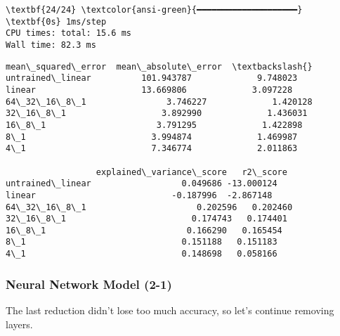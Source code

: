 \documentclass[11pt]{article}
\makeatletter
\newcommand{\boxspacing}{\kern\kvtcb@left@rule\kern\kvtcb@boxsep}
\newcommand{\prompt}[4]{
        {\ttfamily\llap{{\color{#2}[#3]:\hspace{3pt}#4}}\vspace{-\baselineskip}}
    }
\makeatother
\begin{document}
    \begin{Verbatim}[commandchars=\\\{\}]
\textbf{24/24} \textcolor{ansi-green}{━━━━━━━━━━━━━━━━━━━━} \textbf{0s} 1ms/step
CPU times: total: 15.6 ms
Wall time: 82.3 ms
    \end{Verbatim}

            \begin{tcolorbox}[breakable, size=fbox, boxrule=.5pt, pad at break*=1mm, opacityfill=0]
\prompt{Out}{outcolor}{28}{\boxspacing}
\begin{Verbatim}[commandchars=\\\{\}]
                  mean\_squared\_error  mean\_absolute\_error  \textbackslash{}
untrained\_linear          101.943787             9.748023
linear                     13.669806             3.097228
64\_32\_16\_8\_1                3.746227             1.420128
32\_16\_8\_1                   3.892990             1.436031
16\_8\_1                      3.791295             1.422898
8\_1                         3.994874             1.469987
4\_1                         7.346774             2.011863

                  explained\_variance\_score   r2\_score
untrained\_linear                  0.049686 -13.000124
linear                           -0.187996  -2.867148
64\_32\_16\_8\_1                      0.202596   0.202460
32\_16\_8\_1                         0.174743   0.174401
16\_8\_1                            0.166290   0.165454
8\_1                               0.151188   0.151183
4\_1                               0.148698   0.058166
\end{Verbatim}
\end{tcolorbox}
        
    \subsubsection{Neural Network Model
(2-1)}\label{neural-network-model-2-1}

The last reduction didn't lose too much accuracy, so let's continue
removing layers.
\end{document}
